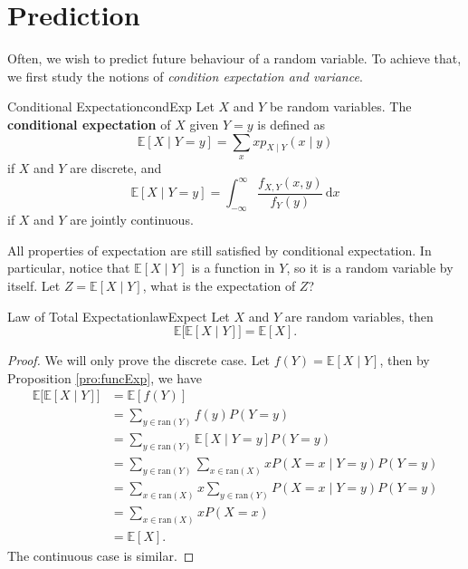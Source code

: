 \documentclass[math]{amznotes}
\theoremstyle{remark}
\newcommand{\0}{\mathbf{0}}
\newcommand{\1}{\mathbf{1}}
\begin{document}
\section{Prediction}
Often, we wish to predict future behaviour of a random variable. To achieve that, we first study the notions of \textit{condition expectation and variance}. 
\begin{dfnbox}{Conditional Expectation}{condExp}
    Let $X$ and $Y$ be random variables. The {\color{red} \textbf{conditional expectation}} of $X$ given $Y = y$ is defined as
    \begin{equation*}
        \mathbb{E}\left[X \mid Y = y\right] = \sum_{x}xp_{X \mid Y}(x \mid y)
    \end{equation*}
    if $X$ and $Y$ are discrete, and
    \begin{equation*}
        \mathbb{E}\left[X \mid Y = y\right] = \int_{-\infty}^{\infty}\!\frac{f_{X, Y}(x, y)}{f_Y(y)}\,\mathrm{d}x
    \end{equation*}
    if $X$ and $Y$ are jointly continuous.
\end{dfnbox}
All properties of expectation are still satisfied by conditional expectation. In particular, notice that $\mathbb{E}\left[X \mid Y\right]$ is a function in $Y$, so it is a random variable by itself. Let $Z = \mathbb{E}[X \mid Y]$, what is the expectation of $Z$?
\begin{thmbox}{Law of Total Expectation}{lawExpect}
    Let $X$ and $Y$ are random variables, then
    \begin{equation*}
        \mathbb{E}\bigl[\mathbb{E}[X \mid Y]\bigr] = \mathbb{E}[X].
    \end{equation*}
    \tcblower
    \begin{proof}
        We will only prove the discrete case. Let $f\left(Y\right) = \mathbb{E}\left[X \mid Y\right]$, then by Proposition \ref{pro:funcExp}, we have 
        \begin{align*}
            \mathbb{E}\bigl[\mathbb{E}\left[X \mid Y\right]\bigr] & = \mathbb{E}\left[f\left(Y\right)\right] \\
            & = \sum_{y \in \mathrm{ran}\left(Y\right)}f\left(y\right)P\left(Y = y\right) \\
            & = \sum_{y \in \mathrm{ran}\left(Y\right)}\mathbb{E}\left[X \mid Y = y\right]P\left(Y = y\right) \\
            & = \sum_{y \in \mathrm{ran}\left(Y\right)}\sum_{x \in \mathrm{ran}\left(X\right)}xP\left(X = x \mid Y = y\right)P\left(Y = y\right) \\
            & = \sum_{x \in \mathrm{ran}\left(X\right)}x\sum_{y \in \mathrm{ran}\left(Y\right)}P\left(X = x \mid Y = y\right)P\left(Y = y\right) \\
            & = \sum_{x \in \mathrm{ran}\left(X\right)}xP\left(X = x\right) \\
            & = \mathbb{E}\left[X\right].
        \end{align*}
        The continuous case is similar.
    \end{proof}
\end{thmbox}
\end{document}
